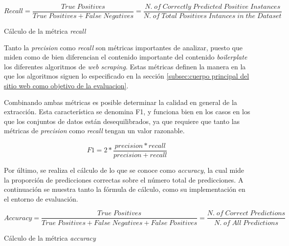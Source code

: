 \begin{equation*}
  Recall = \frac{True\;Positives}{True\;Positives + False\;Negatives} = 
  \frac{N.\;of\;Correctly\;Predicted\;Positive\;Instances}{N.\;of\;Total\;Positives\;Intances\;in\;the\;Dataset}
\end{equation*}

\begin{codefloat}
  
  \caption{Cálculo de la métrica \emph{recall}}
  \label{cod:calculo de la metrica recall}
\end{codefloat}

Tanto la \emph{precision} como \emph{recall} son métricas importantes de analizar, puesto que miden como
de bien diferencian el contenido importante del contenido \emph{boilerplate} los diferentes algoritmos de
\emph{web scraping}. Estas métricas definen la manera en la que los algoritmos siguen lo especificado en
la sección \ref{subsec:cuerpo principal del sitio web como objetivo de la evaluacion}.

Combinando ambas métricas es posible determinar la calidad en general de la extracción. Esta característica
se denomina F1, y funciona bien en los casos en los que los conjuntos de datos están desequilibrados,
ya que requiere que tanto las métricas de \emph{precision} como \emph{recall} tengan un valor razonable.

\begin{equation*}
  F1 = 2 * \frac{precision * recall}{precision + recall}
\end{equation*}

Por último, se realiza el cálculo de lo que se conoce como \emph{accuracy}, la cual mide la proporción de
predicciones correctas sobre el número total de predicciones. A continuación se muestra tanto la fórmula
de cálculo, como su implementación en el entorno de evaluación.

\begin{equation*}
  Accuracy = \frac{True\;Positives}{True\;Positives + False\;Negatives + False\;Positives} = 
  \frac{N.\;of\;Correct\;Predictions}{N.\;of\;All\;Predictions}
\end{equation*}

\begin{codefloat}
  
  \caption{Cálculo de la métrica \emph{accuracy}}
  \label{cod:calculo de la metrica accuracy}
\end{codefloat}

